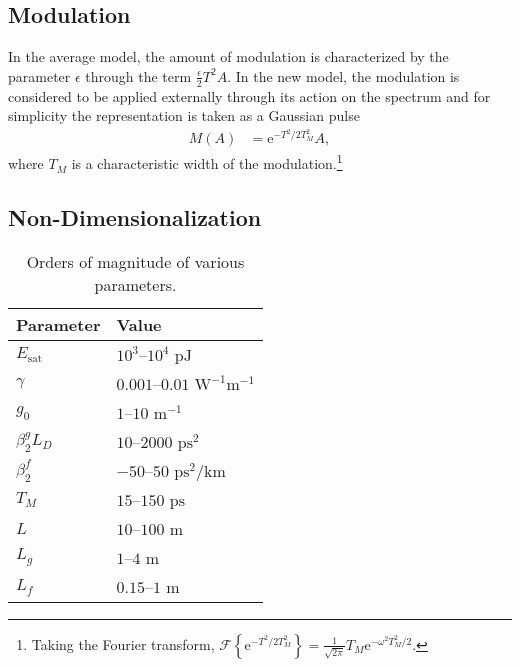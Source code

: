 \documentclass[12pt]{article}
\newcommand{\Es}{E_{\textrm{sat}}}
\newcommand{\FT}[1]{\mathcal{F}\left\{ #1 \right\}}
\begin{document}
\subsection{Modulation}
In the average model, the amount of modulation is characterized by the parameter $\epsilon$ through the term $\frac{\epsilon}{2}T^2 A$. In the new model, the modulation is considered to be applied externally through its action on the spectrum and for simplicity the representation is taken as a Gaussian pulse 
\begin{align}
	M(A) &= \textrm{e}^{-T^2 / 2 T_M^2} A,
\end{align}
where $T_M$ is a characteristic width of the modulation.\footnote{Taking the Fourier transform, $\FT{\textrm{e}^{-T^2/ 2 T_M^2}} = \frac{1}{\sqrt{2\pi}}T_M\textrm{e}^{-\omega^2T_M^2/2}$.}

\subsection{Non-Dimensionalization}

\begin{wraptable}{r}{0.45\textwidth}
\vspace{-15mm}
\begin{center}
\begin{tabular}{|l|l|}
\hline
Parameter & Value \\
\hline
$\Es$ & $10^3$--$10^4 \text{ pJ}$ \\
$\gamma$ & $0.001$--$0.01 \text{ W}^{-1} \text{m}^{-1}$ \cite{agrawal2013} \\
$g_0$ & $1$--$10 \text{ m}^{-1}$ \\
$\beta_2^g L_D$ & $10$--$2000 \text{ ps}^2$ \\
$\beta_2^f$ & $-50$--$50 \text{ ps}^2/ \text{km}$ \\
$T_M$ & $15$--$150 \text{ ps}$ \\
$L$ & $10$--$100 \text{ m}$ \\
$L_g$ & $1$--$4 \text{ m}$ \cite{burgoyne2014, shtyrina, yarutkina} \\
$L_f$ & $0.15$--$1 \text{ m}$ \\
\hline
\end{tabular}
\caption{Orders of magnitude of various parameters.}
\label{tab:values}
\end{center}
\end{wraptable}
\end{document}
